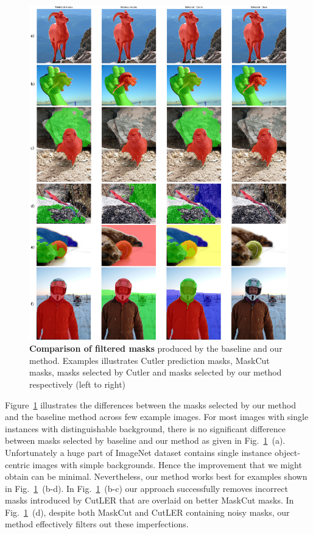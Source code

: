 \begin{figure}
	\centering
	\includegraphics[width=1\textwidth]{Images/main/filtered_mask_comparison.png}
	\caption[\textbf{Mask Filtration Outputs - Baseline vs Ours}]{\textbf{Comparison of filtered masks} produced by the baseline and our method. Examples illustrates Cutler prediction masks, MaskCut masks, masks selected by Cutler and masks selected by our method respectively (left to right)}
	\label{fig:filtered_mask_comparison}
\end{figure}

Figure~\ref{fig:filtered_mask_comparison} illustrates the differences between the masks selected by our method and the baseline method across few example images. For most images with single instances with distinguishable background, there is no significant difference between masks selected by baseline and our method as given in Fig.~\ref{fig:filtered_mask_comparison}~(a). Unfortunately a huge part of ImageNet dataset contains single instance object-centric images with simple backgrounds. Hence the improvement that we might obtain can be minimal. Nevertheless, our method works best for examples shown in Fig.~\ref{fig:filtered_mask_comparison}~(b-d). In Fig.~\ref{fig:filtered_mask_comparison}~(b-c) our approach successfully removes incorrect masks introduced by CutLER that are overlaid on better MaskCut masks. In Fig.~\ref{fig:filtered_mask_comparison}~(d), despite both MaskCut and CutLER containing noisy masks, our method effectively filters out these imperfections.

